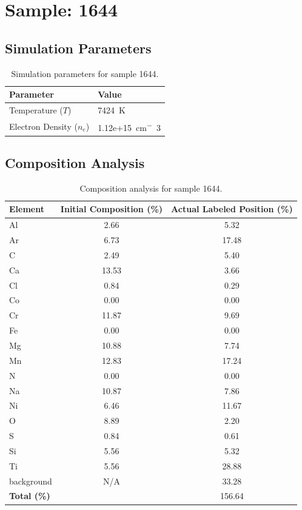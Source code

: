 \documentclass[a4paper,11pt]{article}
\begin{document}
\clearpage

\section{Sample: 1644}
\subsection{Simulation Parameters}
\begin{table}[h!]
    \centering
    \begin{tabular}{ll}
        \toprule
        \textbf{Parameter} & \textbf{Value} \\
        \midrule
        Temperature ($T$) & 7424 \,\si{K} \\
        Electron Density ($n_e$) & 1.12e+15 \,\si{cm^-3} \\
        \bottomrule
    \end{tabular}
    \caption{Simulation parameters for sample 1644.}
    \label{tab:params_1644}
\end{table}

\subsection{Composition Analysis}
\begin{table}[h!]
    \centering
    \begin{tabular}{lcc}
        \toprule
        \textbf{Element} & \textbf{Initial Composition (\%)} & \textbf{Actual Labeled Position (\%)} \\
        \midrule
        Al & 2.66 & 5.32 \\
        Ar & 6.73 & 17.48 \\
        C & 2.49 & 5.40 \\
        Ca & 13.53 & 3.66 \\
        Cl & 0.84 & 0.29 \\
        Co & 0.00 & 0.00 \\
        Cr & 11.87 & 9.69 \\
        Fe & 0.00 & 0.00 \\
        Mg & 10.88 & 7.74 \\
        Mn & 12.83 & 17.24 \\
        N & 0.00 & 0.00 \\
        Na & 10.87 & 7.86 \\
        Ni & 6.46 & 11.67 \\
        O & 8.89 & 2.20 \\
        S & 0.84 & 0.61 \\
        Si & 5.56 & 5.32 \\
        Ti & 5.56 & 28.88 \\
        background & N/A & 33.28 \\

        \midrule
        \textbf{Total (\%)} & & 156.64 \\
        \bottomrule
    \end{tabular}
    \caption{Composition analysis for sample 1644.}
    \label{tab:comp_1644}
\end{table}
\end{document}
